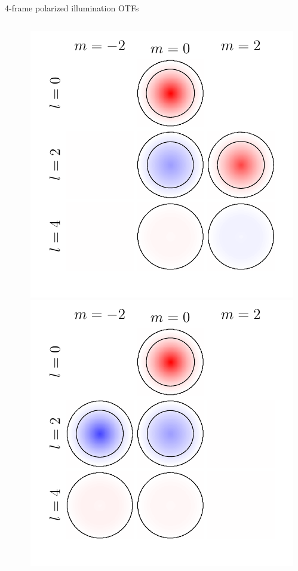\documentclass[presentation]{beamer}
\begin{document}
\begin{frame}[label=sec-1]{4-frame polarized illumination OTFs}
\begin{columns}
\begin{column}{0.25\textwidth}
    \end{column}
    \begin{column}{0.25\textwidth}
      \centering      
      \includegraphics[width=1.0\columnwidth]{pol_illum/otf0.pdf}\\
      \includegraphics[width=1.0\columnwidth]{pol_illum/otf1.pdf}

\end{column}
\end{columns}
\end{frame}
\end{document}

